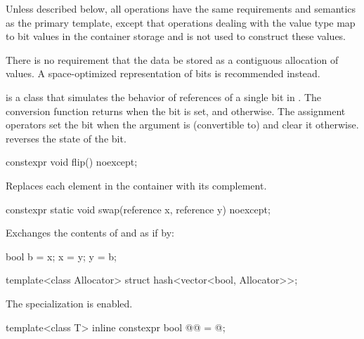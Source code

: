 \pnum
Unless described below, all operations have the same requirements and
semantics as the primary  template, except that operations
dealing with the  value type map to bit values in the
container storage and
is not used to construct these values.

\pnum
There is no requirement that the data be stored as a contiguous allocation
of  values. A space-optimized representation of bits is
recommended instead.

\pnum
{}
is a class that simulates the behavior of references of a single bit in
. The conversion function returns 
when the bit is set, and  otherwise. The assignment operators
set the bit when the argument is (convertible to)  and
clear it otherwise.  reverses the state of the bit.

%
\begin{itemdecl}
constexpr void flip() noexcept;
\end{itemdecl}

\begin{itemdescr}
\pnum
\effects
Replaces each element in the container with its complement.
\end{itemdescr}

%
\begin{itemdecl}
constexpr static void swap(reference x, reference y) noexcept;
\end{itemdecl}

\begin{itemdescr}
\pnum
\effects
Exchanges the contents of  and  as if by:

\begin{codeblock}
bool b = x;
x = y;
y = b;
\end{codeblock}

\end{itemdescr}

\begin{itemdecl}
template<class Allocator> struct hash<vector<bool, Allocator>>;
\end{itemdecl}

\begin{itemdescr}
\pnum
The specialization is enabled.
\end{itemdescr}

%
\begin{itemdecl}
template<class T>
  inline constexpr bool @@ = @\seebelow@;
\end{itemdecl}

